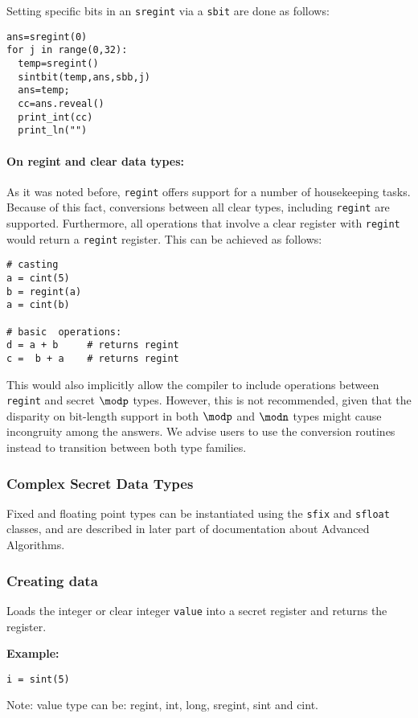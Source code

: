 Setting specific bits in an \verb|sregint| via a \verb|sbit| are done as follows:
\begin{lstlisting}
ans=sregint(0)
for j in range(0,32):
  temp=sregint()
  sintbit(temp,ans,sbb,j)
  ans=temp;
  cc=ans.reveal()
  print_int(cc)
  print_ln("")
\end{lstlisting}


\paragraph{On regint and clear data types:} As it was noted before, \verb|regint| offers support for a number of housekeeping tasks. Because of this fact, conversions between all clear types, including \verb|regint| are supported. Furthermore, all operations that involve a clear register with \verb|regint| would return a \verb|regint| register. This can be achieved as follows: 
\begin{lstlisting}
# casting
a = cint(5)
b = regint(a)
a = cint(b)

# basic  operations:
d = a + b     # returns regint
c =  b + a    # returns regint
\end{lstlisting}
This would also implicitly allow the compiler to include operations between \verb|regint| and secret $\modp$ types. However, this is not recommended, given that the disparity on bit-length support in both $\modp$ and $\modn$ types might cause incongruity among the answers. We advise users to use the conversion routines instead to transition between both type families.

\subsubsection{Complex Secret Data Types}
Fixed and floating point types can be instantiated using the \verb|sfix| and \verb|sfloat| classes, and are described in later part of documentation about Advanced Algorithms.

\subsubsection{Creating data}
Loads the integer or clear integer \verb|value| into a secret register and returns the register.

\noindent
\textbf{Example:}
\begin{lstlisting}
i = sint(5)
\end{lstlisting}
\begin{footnotesize}
Note: value type can be: regint, int, long, sregint, sint and cint.
\end{footnotesize}

